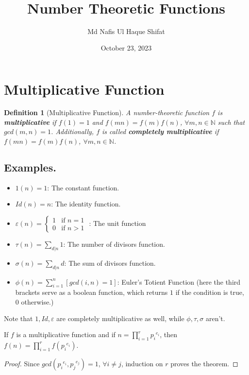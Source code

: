 \documentclass[11pt]{article}
\title{Number Theoretic Functions}
\author{Md Nafis Ul Haque Shifat}
\date{October 23, 2023}
\newtheorem{definition}{Definition}[section]
\begin{document}
\maketitle
\tableofcontents
\newpage
\section{Multiplicative Function}
\begin{definition}[Multiplicative Function]
    A number-theoretic function $f$ is \textbf{multiplicative} if $f(1) = 1$ and $f(mn) = f(m) f(n)$,  $\forall m, n \in \mathbb{N}$ such that $gcd(m, n)  = 1$. Additionally, $f$ is called \textbf{completely multiplicative} if $f(mn) = f(m)f(n)$, $\forall m,n \in \mathbb{N}$.
\end{definition}
\subsection*{Examples.}
\begin{itemize}
    \item $1(n) = 1$: The constant function.
    \item $Id(n) = n$: The identity function.
    \item $
        \varepsilon(n) = 
        \begin{cases}
        1 & \text{if } n = 1 \\
        0 & \text{if } n > 1
        \end{cases}
        $ : The unit function
    \item $\tau(n) = \sum \limits_{d | n} 1$: The number of divisors function.
    \item $\sigma(n) = \sum \limits_{d|n} d$: The sum of divisors function.
    \item $\phi(n) = \sum \limits_{i=1}^{n}  [gcd(i, n) = 1]$: Euler's Totient Function (here the third brackets serve as a boolean function, which returns $1$ if the condition is true, $0$ otherwise.)
\end{itemize}
Note that $1, Id, \varepsilon$ are completely multiplicative as well, while $\phi, \tau, \sigma$ aren't.
\begin{theorem}
    If $f$ is a multiplicative function and if $n = \prod \limits_{i = 1}^{r} {p_i}^{e_i}$, then $f(n) =  \prod \limits_{i = 1}^{r} f({p_i}^{e_i})$.
\end{theorem}
\begin{proof}
    Since $gcd({p_i}^{e_i}, {p_j}^{e_j}) = 1$, $\forall i \neq j$, induction on $r$ proves the theorem.
\end{proof}
\end{document}
